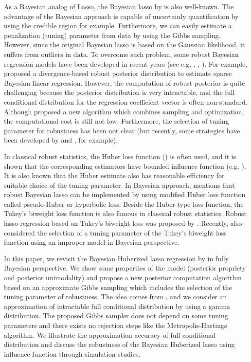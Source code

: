 \documentclass[11pt]{article}
\theoremstyle{plain}
\theoremstyle{definition}
\begin{document}
As a Bayesian analog of Lasso, the Bayesian lasso by \cite{PC08} is also well-known. The advantage of the Bayesian approach is capable of uncertainly quantification by using the credible region for example. Furthermore, we can easily estimate a penalization (tuning) parameter from data by using the Gibbs sampling. However, since the original Bayesian lasso is based on the Gaussian likelihood, it suffers from outliers in data. To overcome such problem, some robust Bayesian regression models have been developed in recent years (see e.g. \cite{NR16}, \cite{HS20}, \cite{HIS20}). For example, \cite{HS20} proposed a divergence-based robust posterior distribution to estimate sparse Bayesian linear regression. However, the computation of robust posterior is quite challenging because the posterior distribution is very intractable, and the full conditional distribution for the regression coefficient vector is often non-standard. Although \cite{HS20} proposed a new algorithm which combines sampling and optimization, the computational cost is still not low. Furthermore, the selection of tuning parameter for robustness has been not clear (but recently, some strategies have been developed by \cite{SY21} and \cite{YS21}, for example). 

In classical robust statistics, the Huber loss function (\cite{H64}) is often used, and it is shown that the corresponding estimators have bounded influence function (e.g. \cite{HRRS11}). It is also known that the Huber estimate also has reasonable efficiency for suitable choice of the tuning parameter. In Bayesian approach, \cite{PC08} mentions that robust Bayesian lasso can be implemented by using modified Huber loss function called pseudo-Huber or hyperbolic loss. Beside the Huber-type loss function, the Tukey's biweight loss function is also famous in classical robust statistics. Robust lasso regression based on Tukey's biweight loss was proposed by \cite{CRW18}. Recently, \cite{JR21} also considered the selection of a tuning parameter of the Tukey's biweight loss function using an improper model in Bayesian perspective.

In this paper, we revisit the Bayesian Huberized lasso regression by \cite{PC08} in fully Bayesian perspective. We show some properties of the model (posterior propriety and posterior unimodality) and propose a new posterior computation algorithm based on an approximate Gibbs sampling which includes the selection of the tuning parameter of robustness. The idea comes from \cite{M19}, and we consider an approximation of intractable full conditional distribution by using a gamma distribution. The proposed Gibbs sampler does not depend on some tuning parameters and there exists no rejection steps like the Metropolis-Hastings algorithm. We illustrate the approximation accuracy of full conditional distribution and discuss the robustness of the Bayesian Huberized lasso using influence function through  simulation studies. 
\end{document}

